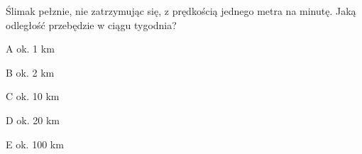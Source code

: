\begin{tresc}
Ślimak pełznie, nie zatrzymując się, z prędkością jednego metra na minutę. Jaką odległość przebędzie w ciągu tygodnia?
\end{tresc}
\begin{wariant}{A} ok. 1 km \end{wariant}
\begin{wariant}{B} ok. 2 km \end{wariant}
\begin{wariant}{C} ok. 10 km \end{wariant}
\begin{wariant}{D} ok. 20 km \end{wariant}
\begin{wariant}{E} ok. 100 km \end{wariant}
